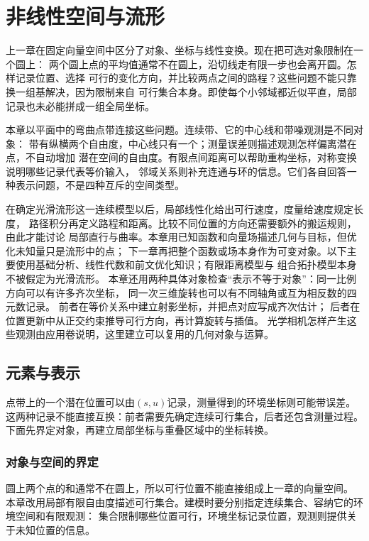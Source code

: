 \chapter{非线性空间与流形}
\label{chap:differential-geometry-and-symmetry}

上一章在固定向量空间中区分了对象、坐标与线性变换。现在把可选对象限制在一个圆上：
两个圆上点的平均值通常不在圆上，沿切线走有限一步也会离开圆。怎样记录位置、选择
可行的变化方向，并比较两点之间的路程？这些问题不能只靠换一组基解决，因为限制来自
可行集合本身。即使每个小邻域都近似平直，局部记录也未必能拼成一组全局坐标。

本章以平面中的弯曲点带连接这些问题。连续带、它的中心线和带噪观测是不同对象：
带有纵横两个自由度，中心线只有一个；测量误差则描述观测怎样偏离潜在点，不自动增加
潜在空间的自由度。有限点间距离可以帮助重构坐标，对称变换说明哪些记录代表等价输入，
邻域关系则补充连通与环的信息。它们各自回答一种表示问题，不是四种互斥的空间类型。

在确定光滑流形这一连续模型以后，局部线性化给出可行速度，度量给速度规定长度，
路径积分再定义路程和距离。比较不同位置的方向还需要额外的搬运规则，由此才能讨论
局部直行与曲率。本章用已知函数和向量场描述几何与目标，但优化未知量只是流形中的点；
下一章再把整个函数或场本身作为可变对象。以下主要使用基础分析、线性代数和前文优化知识；有限距离模型与
组合拓扑模型本身不被假定为光滑流形。
本章还用两种具体对象检查“表示不等于对象”：同一比例方向可以有许多齐次坐标，
同一次三维旋转也可以有不同轴角或互为相反数的四元数记录。
前者在等价关系中建立射影坐标，并把点对应写成齐次估计；
后者在位置更新中从正交约束推导可行方向，再计算旋转与插值。
光学相机怎样产生这些观测由应用卷说明，这里建立可以复用的几何对象与运算。

\section{元素与表示}
\label{sec:geometry-nonlinear-representations}

点带上的一个潜在位置可以由$(s,u)$记录，测量得到的环境坐标则可能带误差。
这两种记录不能直接互换：前者需要先确定连续可行集合，后者还包含测量过程。
下面先界定对象，再建立局部坐标与重叠区域中的坐标转换。

\subsection{对象与空间的界定}
\label{sec:geometry-objects}

圆上两个点的和通常不在圆上，所以可行位置不能直接组成上一章的向量空间。
本章改用局部有限自由度描述可行集合。建模时要分别指定连续集合、容纳它的环境空间和有限观测：
集合限制哪些位置可行，环境坐标记录位置，观测则提供关于未知位置的信息。

